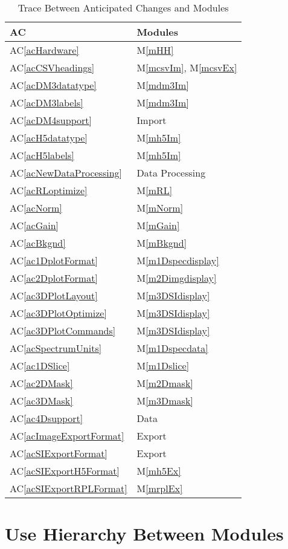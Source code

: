 \documentclass[12pt, titlepage]{article}
\newcommand{\acref}[1]{AC\ref{#1}}
\newcommand{\mref}[1]{M\ref{#1}}
\begin{document}
\begin{table}[H]
\centering
\begin{tabular}{p{} p{}}
	\toprule
	\textbf{AC} & \textbf{Modules}\\
	\midrule
	\acref{acHardware} & \mref{mHH}\\
	\acref{acCSVheadings} & \mref{mcsvIm}, \mref{mcsvEx}\\
	\acref{acDM3datatype} & \mref{mdm3Im}\\
	\acref{acDM3labels} & \mref{mdm3Im}\\
	\acref{acDM4support} & Import\\
	\acref{acH5datatype} & \mref{mh5Im}\\
	\acref{acH5labels} & \mref{mh5Im}\\
	\acref{acNewDataProcessing} & Data Processing\\
	\acref{acRLoptimize} & \mref{mRL}\\
	\acref{acNorm} & \mref{mNorm}\\
	\acref{acGain} & \mref{mGain}\\
	\acref{acBkgnd} & \mref{mBkgnd}\\
	\acref{ac1DplotFormat} & \mref{m1Dspecdisplay}\\
	\acref{ac2DplotFormat} & \mref{m2Dimgdisplay}\\
	\acref{ac3DPlotLayout} & \mref{m3DSIdisplay}\\
	\acref{ac3DPlotOptimize} & \mref{m3DSIdisplay}\\
	\acref{ac3DPlotCommands} & \mref{m3DSIdisplay}\\
	\acref{acSpectrumUnits} & \mref{m1Dspecdata}\\
	\acref{ac1DSlice} & \mref{m1Dslice}\\
	\acref{ac2DMask} & \mref{m2Dmask}\\
	\acref{ac3DMask} & \mref{m3Dmask}\\
	\acref{ac4Dsupport} & Data\\
	\acref{acImageExportFormat} & Export\\
	\acref{acSIExportFormat} & Export\\
	\acref{acSIExportH5Format} & \mref{mh5Ex}\\
	\acref{acSIExportRPLFormat} & \mref{mrplEx}\\
	\bottomrule
\end{tabular}
\caption{Trace Between Anticipated Changes and Modules}
\label{TblACT}
\end{table}

\section{Use Hierarchy Between Modules} \label{SecUse}
\end{document}
